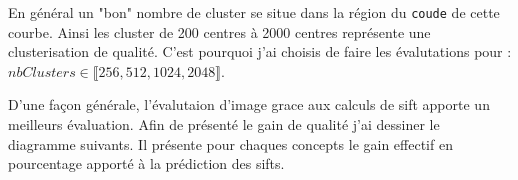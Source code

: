 \documentclass[a4paper, 11pt]{article}
\begin{document}
\begin{center}
\end{center}

En général un "bon" nombre de cluster se situe dans la région du \texttt{coude} de cette courbe. Ainsi les cluster de 200 centres à 2000 centres représente une clusterisation de qualité. C'est pourquoi j'ai choisis de faire les évalutations pour : 
$nbClusters \in \llbracket  256,512,1024,2048 \rrbracket$. 

D'une façon générale, l'évalutaion d'image grace aux calculs de sift apporte un meilleurs évaluation. Afin de présenté le gain de qualité j'ai dessiner le diagramme suivants. Il présente pour chaques concepts le gain effectif en pourcentage apporté à la prédiction des sifts.
\end{document}
